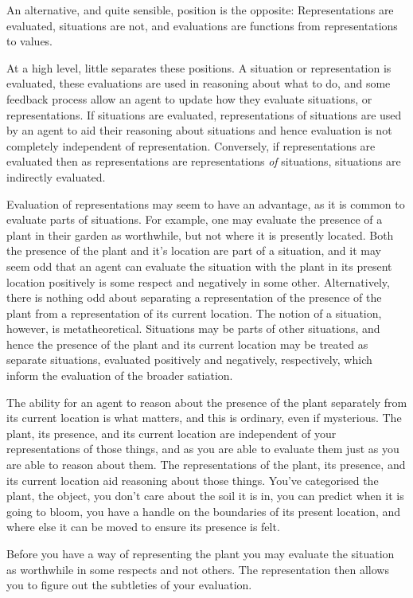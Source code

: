 \documentclass[10pt]{article}
\begin{document}
An alternative, and quite sensible, position is the opposite: Representations are evaluated, situations are not, and evaluations are functions from representations to values.

At a high level, little separates these positions.
A situation or representation is evaluated, these evaluations are used in reasoning about what to do, and some feedback process allow an agent to update how they evaluate situations, or representations.
If situations are evaluated, representations of situations are used by an agent to aid their reasoning about situations and hence evaluation is not completely independent of representation.
Conversely, if representations are evaluated then as representations are representations \emph{of} situations, situations are indirectly evaluated.

Evaluation of representations may seem to have an advantage, as it is common to evaluate parts of situations.
For example, one may evaluate the presence of a plant in their garden as worthwhile, but not where it is presently located.
Both the presence of the plant and it's location are part of a situation, and it may seem odd that an agent can evaluate the situation with the plant in its present location positively is some respect and negatively in some other.
Alternatively, there is nothing odd about separating a representation of the presence of the plant from a representation of its current location.
The notion of a situation, however, is metatheoretical.
Situations may be parts of other situations, and hence the presence of the plant and its current location may be treated as separate situations, evaluated positively and negatively, respectively, which inform the evaluation of the broader satiation.

The ability for an agent to reason about the presence of the plant separately from its current location is what matters, and this is ordinary, even if mysterious.
The plant, its presence, and its current location are independent of your representations of those things, and as you are able to evaluate them just as you are able to reason about them.
The representations of the plant, its presence, and its current location aid reasoning about those things.
You've categorised the plant, the object, you don't care about the soil it is in, you can predict when it is going to bloom, you have a handle on the boundaries of its present location, and where else it can be moved to ensure its presence is felt.


Before you have a way of representing the plant you may evaluate the situation as worthwhile in some respects and not others.
The representation then allows you to figure out the subtleties of your evaluation.
\end{document}
